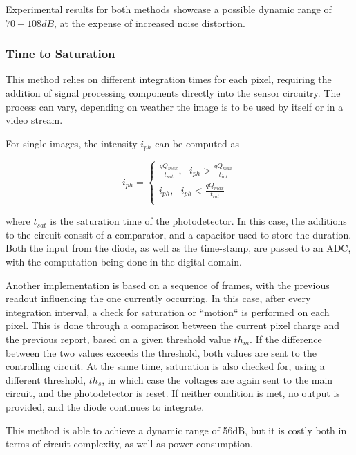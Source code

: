 Experimental results for both methods showcase a possible dynamic range of \(70-108dB\), at the expense of
increased noise distortion. \cite{withSampling, withPredictive}

\subsubsection{Time to Saturation}

This method relies on different integration times for each pixel, requiring the addition of signal processing
components directly into the sensor circuitry. The process can vary, depending on weather the image is to
be used by itself or in a video stream.

For single images, the intensity \(i_{ph}\) can be computed as

\begin{equation}
    \label{eqIph}
    i_{ph} = 
    \begin{cases}
        \frac{qQ_{max}}{t_{sat}}, \text{ } i_{ph} > \frac{qQ_{max}}{t_{int}} \\
        i_{ph}, \text{ } i_{ph} < \frac{qQ_{max}}{t_{int}} \\
    \end{cases}
\end{equation}

where \(t_{sat}\) is the saturation time of the photodetector. In this case, the additions to the circuit conssit
of a comparator, and a capacitor used to store the duration. Both the input from the diode, as well as the 
time-stamp, are passed to an ADC, with the computation being done in the digital domain. \cite{stanford}

Another implementation is based on a sequence of frames, with the previous readout influencing the one currently
occurring. In this case, after every integration interval, a check for saturation or ``motion`` is performed on
each pixel. This is done through a comparison between the current pixel charge and the previous report, based
on a given threshold value \(th_{m}\). If the difference between the two values exceeds the threshold, both values
are sent to the controlling circuit. At the same time, saturation is also checked for, using a different 
threshold, \(th_{s}\), in which case the voltages are again sent to the main circuit, and the photodetector is
reset. If neither condition is met, no output is provided, and the diode continues to integrate. \cite{withTime}

This method is able to achieve a dynamic range of 56dB, but it is costly both in terms of circuit complexity, as 
well as power consumption. \cite{stanford, withTime}

